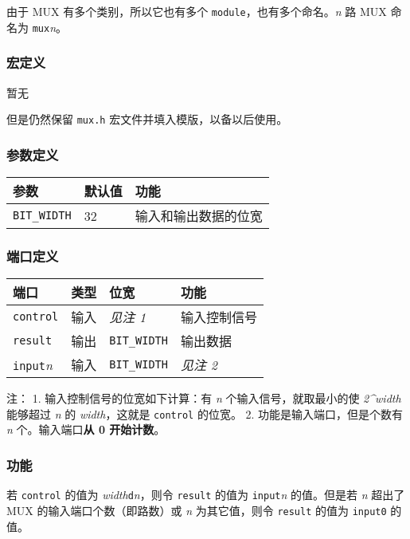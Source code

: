 由于 MUX 有多个类别，所以它也有多个
\texttt{module}，也有多个命名。\emph{n} 路 MUX 命名为
\texttt{mux}\emph{n}。

\hypertarget{ux5b8fux5b9aux4e49-7}{%
\subsubsection{宏定义}\label{ux5b8fux5b9aux4e49-7}}

暂无

但是仍然保留 \texttt{mux.h} 宏文件并填入模版，以备以后使用。

\hypertarget{ux53c2ux6570ux5b9aux4e49}{%
\subsubsection{参数定义}\label{ux53c2ux6570ux5b9aux4e49}}

\begin{longtable}[]{@{}lll@{}}
\toprule
参数 & 默认值 & 功能\tabularnewline
\midrule
\endhead
\texttt{BIT\_WIDTH} & 32 & 输入和输出数据的位宽\tabularnewline
\bottomrule
\end{longtable}

\hypertarget{ux7aefux53e3ux5b9aux4e49-5}{%
\subsubsection{端口定义}\label{ux7aefux53e3ux5b9aux4e49-5}}

\begin{longtable}[]{@{}llll@{}}
\toprule
端口 & 类型 & 位宽 & 功能\tabularnewline
\midrule
\endhead
\texttt{control} & 输入 & \emph{见注 1} & 输入控制信号\tabularnewline
\texttt{result} & 输出 & \texttt{BIT\_WIDTH} & 输出数据\tabularnewline
\texttt{input}\emph{n} & 输入 & \texttt{BIT\_WIDTH} & \emph{见注
2}\tabularnewline
\bottomrule
\end{longtable}

注： 1. 输入控制信号的位宽如下计算：有 \emph{n} 个输入信号，就取最小的使
\emph{2\^{}width} 能够超过 \emph{n} 的 \emph{width}，这就是
\texttt{control} 的位宽。 2. 功能是输入端口，但是个数有 \emph{n}
个。输入端口\textbf{从 0 开始计数}。

\hypertarget{ux529fux80fd-10}{%
\subsubsection{功能}\label{ux529fux80fd-10}}

若 \texttt{control} 的值为
\emph{width}\texttt{\textquotesingle{}d}\emph{n}，则令 \texttt{result}
的值为 \texttt{input}\emph{n} 的值。但是若 \emph{n} 超出了 MUX
的输入端口个数（即路数）或 \emph{n} 为其它值，则令 \texttt{result}
的值为 \texttt{input0} 的值。

